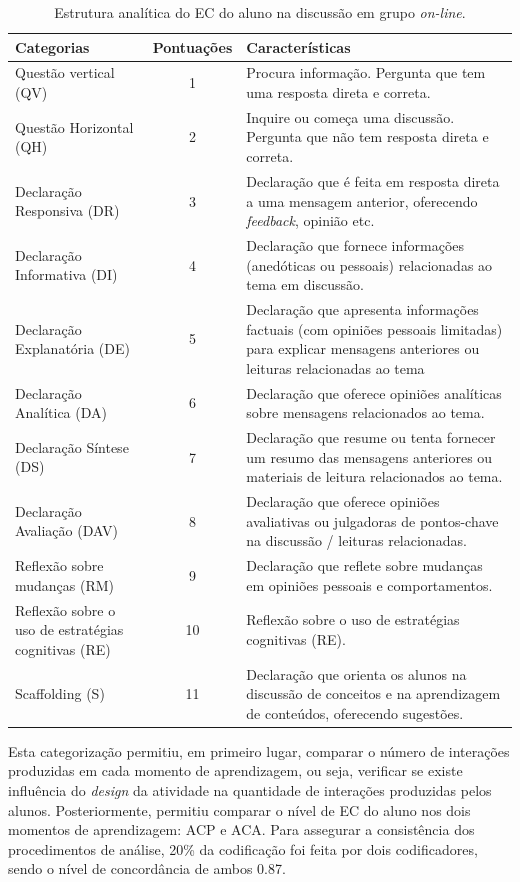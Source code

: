 \documentclass[portuguese]{textolivre}
\begin{document}
\begin{table}[h]
\caption{Estrutura analítica do EC do aluno na discussão em grupo \textit{on-line}.}
\label{tab1}
\begin{tabular}{p{}cp{}}
\toprule 
\textbf{Categorias} & \textbf{Pontuações} & \textbf{Características} \\ 
\midrule
Questão vertical (QV) & 1 & Procura informação. Pergunta que tem uma resposta direta e correta. \\
Questão Horizontal (QH) & 2 & Inquire ou começa uma discussão. Pergunta que não tem resposta direta e correta. \\
Declaração Responsiva (DR) & 3 & Declaração que é feita em resposta direta a uma mensagem anterior, oferecendo \textit{feedback}, opinião etc. \\
Declaração Informativa (DI) & 4 & Declaração que fornece informações (anedóticas ou pessoais) relacionadas ao tema em discussão. \\
Declaração Explanatória (DE) & 5 & Declaração que apresenta informações factuais (com opiniões pessoais limitadas) para explicar mensagens anteriores ou leituras relacionadas ao tema \\
Declaração Analítica (DA) & 6 & Declaração que oferece opiniões analíticas sobre mensagens relacionados ao tema. \\
Declaração Síntese (DS) & 7 & Declaração que resume ou tenta fornecer um resumo das mensagens anteriores ou materiais de leitura relacionados ao tema. \\
Declaração Avaliação (DAV) & 8 & Declaração que oferece opiniões avaliativas ou julgadoras de pontos-chave na discussão / leituras relacionadas. \\
Reflexão sobre mudanças (RM) & 9 & Declaração que reflete sobre mudanças em opiniões pessoais e comportamentos. \\
Reflexão sobre o uso de estratégias cognitivas (RE) & 10 & Reflexão sobre o uso de estratégias cognitivas (RE). \\ 
Scaffolding (S) & 11 & Declaração que orienta os alunos na discussão de conceitos e na aprendizagem de conteúdos, oferecendo sugestões. \\
\bottomrule
\end{tabular}
\end{table}

Esta categorização permitiu, em primeiro lugar, comparar o número de interações produzidas em cada momento de aprendizagem, ou seja, verificar se existe influência do \textit{design} da atividade na quantidade de interações produzidas pelos alunos. Posteriormente, permitiu comparar o nível de EC do aluno nos dois momentos de aprendizagem: ACP e ACA. Para assegurar a consistência dos procedimentos de análise, 20\% da codificação foi feita por dois codificadores, sendo o nível de concordância de ambos 0.87.
\end{document}

